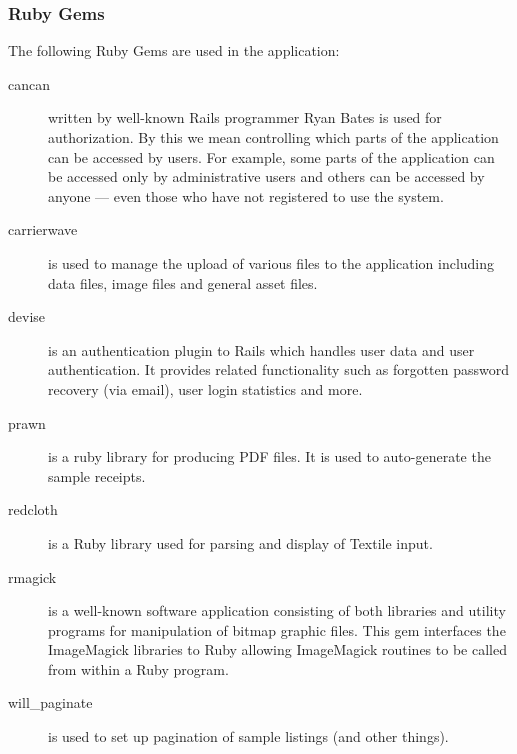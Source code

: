 \documentclass[12pt,twoside]{article}
\begin{document}
\subsubsection{Ruby Gems}
The following Ruby Gems are used in the application:
\begin{description}
\item[cancan\cite{cancan}]
written by well-known Rails programmer Ryan Bates is used for
authorization. By this we mean controlling which parts of the application
can be accessed by users. For example, some parts of the application can
be accessed only by administrative users and others can be accessed by
anyone --- even those who have not registered to use the system.
\item[carrierwave\cite{carrierwave}]
is used to manage the upload of various files to the application
including data files, image files and general asset files.
\item[devise\cite{devise}]
is an authentication plugin to Rails which handles user data and
user authentication. It provides related functionality such as forgotten
password recovery (via email), user login statistics and more.
\item[prawn\cite{prawn}]
is a ruby library for producing PDF files. It is used to
auto-generate the sample receipts.
\item[redcloth\cite{redcloth}]
is a Ruby library used for parsing and display of Textile input.
\item[rmagick\cite{rmagick}]
is a well-known software application consisting of both
libraries and utility programs for manipulation of bitmap graphic files.
This gem interfaces the ImageMagick libraries to Ruby allowing
ImageMagick routines to be called from within a Ruby program.
\item[will\_paginate\cite{willp}]
is used to set up pagination of sample listings (and other things).
\end{description}
\end{document}
